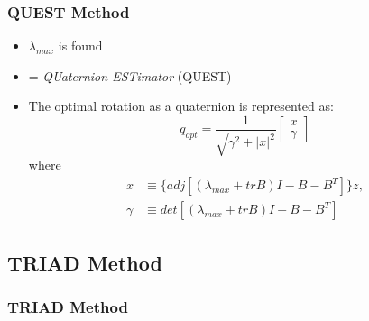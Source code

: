 \documentclass[11pt]{beamer}
\begin{document}
    \begin{frame}
        \frametitle{QUEST Method}
        \begin{itemize}[<+->]
            \item $\lambda_{max}$ is found
            \item = \textit{QUaternion ESTimator} (QUEST) \medskip
            \item The optimal rotation as a quaternion is represented as:
            \begin{equation}
                q_{opt} = \frac{1}{\sqrt{\gamma^2 + |x|^2}}
                \begin{bmatrix}
                    x \\
                    \gamma
                \end{bmatrix}
            \end{equation}
            where
            \begin{align*}
                x &\equiv \{ adj[(\lambda_{max} + trB) I - B - B^T] \} z, \\
                \gamma &\equiv det[(\lambda_{max} + trB) I - B - B^T]
            \end{align*}
        \end{itemize}
    \end{frame}

    \subsection{TRIAD Method}\label{subsec:triadMethod}
    \begin{frame}
        \frametitle{TRIAD Method}

    \end{frame}

    \begin{frame}
    \end{frame}
\end{document}
